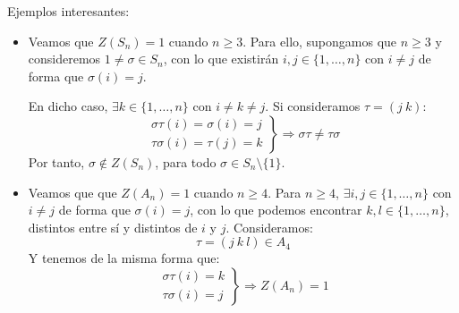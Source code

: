 \begin{ejemplo} %
    Ejemplos interesantes:
    \begin{itemize}
        \item Veamos que $Z(S_n) = 1$ cuando $n\geq 3$. Para ello, supongamos que $n\geq 3$ y consideremos $1\neq \sigma\in S_n$, con lo que existirán $i,j\in \{1,\ldots,n\}$ con $i\neq j$ de forma que $\sigma(i) = j$.

            En dicho caso, $\exists k\in \{1,\ldots,n\}$ con $i\neq k \neq j$. Si consideramos $\tau = (j\ k)$:
            \begin{equation*}
                \left.\begin{array}{r}
                    \sigma\tau(i) = \sigma(i) = j \\
                    \tau\sigma(i) = \tau(j) = k
                \end{array}\right\} \Longrightarrow \sigma\tau \neq \tau \sigma
            \end{equation*}
            Por tanto, $\sigma\notin Z(S_n)$, para todo $\sigma\in S_n\setminus\{1\}$.
        \item Veamos que  que $Z(A_n) = 1$ cuando $n\geq 4$. Para $n\geq 4$, $\exists i,j\in \{1,\ldots,n\}$ con $i\neq j$ de forma que $\sigma(i) = j$, con lo que podemos encontrar $k,l\in \{1,\ldots,n\}$, distintos entre sí y distintos de $i$ y $j$. Consideramos:
            \begin{equation*}
                \tau = (j\ k\ l) \in A_4
            \end{equation*}
            Y tenemos de la misma forma que:
            \begin{equation*}
                \left.\begin{array}{r}
                        \sigma\tau(i) = k \\
                        \tau\sigma(i) = j
                \end{array}\right\} \Longrightarrow Z(A_n) = 1
            \end{equation*}
    \end{itemize}
\end{ejemplo}

